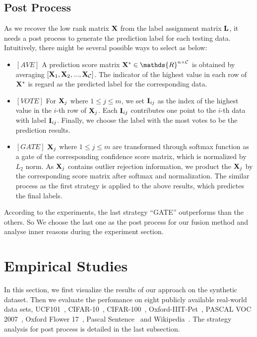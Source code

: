 \documentclass[letterpaper]{article}
\def\bI{{\bf I}}
\def\calC{{\mathcal{C}}}
\def\bL{{\bf L}}
\def\dsR{\mathds{R}}
\def\bX{{\bf X}}
\def\bI{{\bf I}}
\def\bX{{\bf X}}
\begin{document}
\subsection{Post Process}
As we recover the low rank matrix $\bX$ from the label assignment matrix $\bL$,
it needs a post process to generate the prediction label for each testing data.
Intuitively, there might be several possible ways to select as below:
\begin{itemize}
  \item $[AVE]$ A prediction score matrix $\bX^{*} \in \dsR^{n \times {\calC}}$ is obtained by averaging $[ \bX_1, \bX_2, ..., \bX_{\calC}]$.
		The indicator of the highest value in each row of $\bX^{*}$ is regard as the predicted label for the corresponding data.
  \item $[VOTE]$ For $\bX_j$ where $1 \leq j \leq m$, we set $\bI_{ij}$ as the index of the highest value in the $i$-th row of $\bX_j$.
  		Each $\bI_{ij}$ contributes one point to the $i$-th data with label $\bI_{ij}$.
  		Finally, we choose the label with the most votes to be the prediction results.
  \item $[GATE]$ $\bX_j$ where $1 \leq j \leq m$ are transformed through softmax function as a gate of the corresponding confidence score matrix, which is normalized by $L_2$ norm.
  		As $\bX_j$ contains outlier rejection information, we product the $\bX_j$ by the corresponding score matrix after softmax and normalization.
  		The similar process as the first strategy is applied to the above results, which predictes the final labels.
\end{itemize}
According to the experiments, the last strategy ``GATE'' outperforms than the others.
So We choose the last one as the post process for our fusion method and analyse inner reasons during the experiment section.


\section{Empirical Studies}

In this section, we first visualize the results of our approach on the synthetic dataset.
Then we evaluate the perfomance on eight publicly available real-world data sets,
UCF101~\cite{soomro2012ucf101}, CIFAR-10~\cite{krizhevsky2009learning}, CIFAR-100~\cite{krizhevsky2009learning}, Oxford-IIIT-Pet~\cite{parkhi2012cats}, PASCAL VOC 2007~\cite{pascal-voc-2007}, Oxford Flower 17~\cite{nilsback2006visual}, Pascal Sentence~\cite{rashtchian2010collecting} and Wikipedia~\cite{rasiwasia2010new}.
The strategy analysis for post process is detailed in the last subsection.
\end{document}
